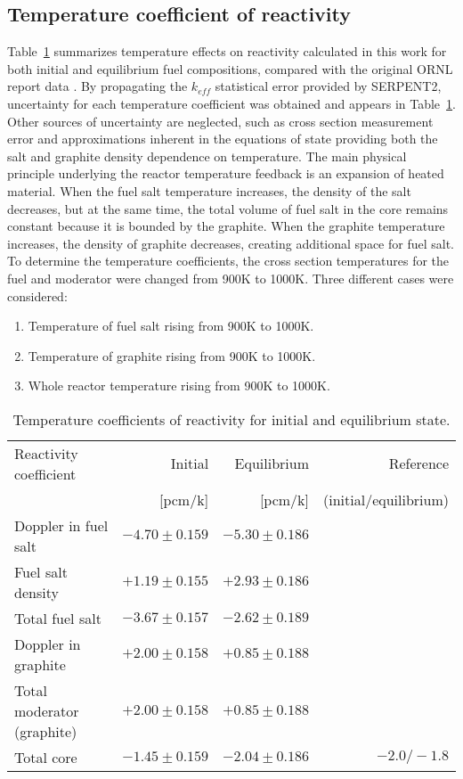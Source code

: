 \subsection{Temperature coefficient of reactivity}
Table~\ref{tab:tcoef} summarizes temperature effects on reactivity calculated 
in this work for both initial and equilibrium fuel compositions, compared 
with the original \gls{ORNL} report data \cite{robertson_conceptual_1971}. 
By propagating the $k_{eff}$  statistical error provided by SERPENT2, 
uncertainty for each temperature coefficient was obtained and appears in 
Table~\ref{tab:tcoef}. Other sources of uncertainty are neglected, such as cross section 
measurement error and approximations inherent in the equations of state 
providing both the salt and graphite density dependence on temperature.
 The main physical principle underlying the reactor 
temperature feedback is an expansion of heated material. When the fuel 
salt temperature increases, the density of the salt decreases, but at the same 
time, the total volume of fuel salt in the core remains constant because it is 
bounded by the graphite. When the graphite temperature increases, the density 
of graphite decreases, creating additional space for fuel salt. To determine 
the temperature coefficients, the cross section temperatures for the fuel and 
moderator were changed from 900K to 1000K. Three different cases were considered:
\begin{enumerate}
  \item Temperature of fuel salt rising from 900K to 1000K.
  \item Temperature of graphite rising from 900K to 1000K.
  \item Whole reactor temperature rising from 900K to 1000K.
\end{enumerate}
\begin{table}[ht!]
  \caption{Temperature coefficients of reactivity for initial and equilibrium 
  state.}
\begin{tabularx}{\textwidth}{ X | r | r | r } \hline
Reactivity coefficient               & Initial         & Equilibrium     & Reference                                 \\ 
                                        & [pcm/k]         &  [pcm/k]        & (initial/equilibrium)\cite{li_optimization_2018} \tabularnewline  \hline
Doppler in fuel salt                    & $-4.70\pm0.159$ & $-5.30\pm0.186$ & 
\tabularnewline
Fuel salt density                       & $+1.19\pm0.155$ & $+2.93\pm0.186$ & 
\tabularnewline
Total fuel salt                         & $-3.67\pm0.157$ & $-2.62\pm0.189$ & 
\tabularnewline \hline
Doppler in graphite                     & $+2.00\pm0.158$ & $+0.85\pm0.188$ &          \tabularnewline
Total moderator (graphite)              & $+2.00\pm0.158$ & $+0.85\pm0.188$ & 
\tabularnewline \hline
Total core                              & $-1.45\pm0.159$ & $-2.04\pm0.186$ & $-2.0/-1.8$  \tabularnewline \hline
\end{tabularx}
  \label{tab:tcoef}
\end{table}
